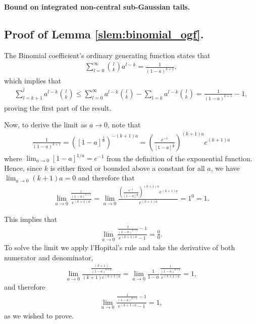 \begin{prop} {\bf Bound on integrated non-central sub-Gaussian tails.}
\begin{enumerate}[leftmargin=*,label=(\roman*)]
\end{enumerate}



\label{prop:intbound_sg_noncentral}
\end{prop}



\subsection{Proof of Lemma \ref{slem:binomial_ogf}.} The Binomial coefficient's ordinary generating function states that
\begin{align}
 \sum_{l=0}^\infty {l \choose k} a^{l-k} = \frac{1}{(1 - a)^{k+1}},
\nonumber
\end{align}
which implies that 
\begin{align}
  \sum_{l=k+1}^{\bar{l}} a^{l-k} {l \choose k}
\leq  \sum_{l=0}^{\infty} a^{l-k} {l \choose k}   -  \sum_{l=k} a^{l-k} {l \choose k}
= \frac{1}{(1 - a)^{k+1}} - 1,
\nonumber
\end{align}
proving the first part of the result.

Now, to derive the limit as $a \rightarrow 0$, note that 
\begin{align}
 \frac{1}{(1 - a)^{k+1}}=
\left([1 - a]^{\frac{1}{a}} \right)^{-(k+1)a}
= \left(\frac{e^{-1}}{[1 - a]^{\frac{1}{a}}} \right)^{(k+1)a} e^{(k+1)a}
\nonumber
\end{align}
where $\lim_{a \rightarrow 0} [1-a]^{1/a}= e^{-1}$ from the definition of the exponential function.
Hence, since $k$ is either fixed or bounded above a constant for all $a$, we have $\lim_{a \rightarrow 0} (k+1)a=0$ and therefore that
\begin{align}
\lim_{a \rightarrow 0  } \frac{\frac{1}{(1 - a)^{k+1}}}{e^{(k+1)a}}
=\lim_{a \rightarrow 0} \frac{\left(\frac{e^{-1}}{[1 - a]^{\frac{1}{a}}} \right)^{(k+1)a} e^{(k+1)a}}{e^{(k+1)a}}= 1^0 = 1.
\nonumber
\end{align}

This implies that
\begin{align}
\lim_{a \rightarrow 0  } \frac{\frac{1}{(1 - a)^{k+1}} -1 }{e^{(k+1)a} -1}= \frac{0}{0}.
\nonumber
\end{align}
To solve the limit we apply l'Hopital's rule and take the derivative of both numerator and denominator,
\begin{align}
 \lim_{a \rightarrow 0} \frac{\frac{(k+1)}{(1-a)^{k+2}}}{(k+1)e^{(k+1)a}}=
\lim_{a \rightarrow 0} \frac{1}{1-a} \frac{\frac{1}{(1-a)^{k+1}}}{e^{(k+1)a}}=1,
\nonumber
\end{align}
and therefore
\begin{align}
 \lim_{a \rightarrow 0  } \frac{\frac{1}{(1 - a)^{k+1}} -1 }{e^{(k+1)a} -1}= 1,
\nonumber
\end{align}
as we wished to prove.





